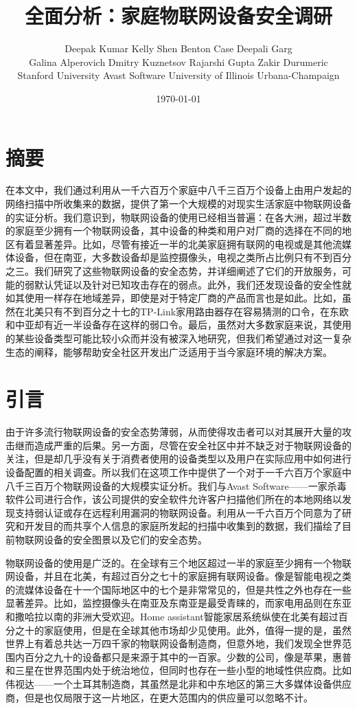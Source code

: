\documentclass[UTF8]{ctexart}
\title{全面分析：家庭物联网设备安全调研}
\author{Deepak Kumar  Kelly Shen  Benton Case  Deepali Garg\\Galina Alperovich  Dmitry Kuznetsov  Rajarshi Gupta  Zakir Durumeric \\Stanford University  Avast Software University of Illinois Urbana-Champaign}
\date{\today}
\begin{document}
	\tableofcontents
	\maketitle
	\section*{摘要}
	在本文中，我们通过利用从一千六百万个家庭中八千三百万个设备上由用户发起的网络扫描中所收集来的数据，提供了第一个大规模的对现实生活家庭中物联网设备的实证分析。我们意识到，物联网设备的使用已经相当普遍：在各大洲，超过半数的家庭至少拥有一个物联网设备，其中设备的种类和用户对厂商的选择在不同的地区有着显著差异。比如，尽管有接近一半的北美家庭拥有联网的电视或是其他流媒体设备，但在南亚，大多数设备却是监控摄像头，电视之类所占比例只有不到百分之三。我们研究了这些物联网设备的安全态势，并详细阐述了它们的开放服务，可能的弱默认凭证以及针对已知攻击存在的弱点。此外，我们还发现设备的安全性就如其使用一样存在地域差异，即使是对于特定厂商的产品而言也是如此。比如，虽然在北美只有不到百分之十七的TP-Link家用路由器存在容易猜测的口令，在东欧和中亚却有近一半设备存在这样的弱口令。最后，虽然对大多数家庭来说，其使用的某些设备类型可能比较小众而并没有被深入地研究，但我们希望通过对这一复杂生态的阐释，能够帮助安全社区开发出广泛适用于当今家庭环境的解决方案。
	
	\section{引言}
	由于许多流行物联网设备的安全态势薄弱，从而使得攻击者可以对其展开大量的攻击继而造成严重的后果。另一方面，尽管在安全社区中并不缺乏对于物联网设备的关注，但是却几乎没有关于消费者使用的设备类型以及用户在实际应用中如何进行设备配置的相关调查。所以我们在这项工作中提供了一个对于一千六百万个家庭中八千三百万个物联网设备的大规模实证分析。我们与Avast Software——一家杀毒软件公司进行合作，该公司提供的安全软件允许客户扫描他们所在的本地网络以发现支持弱认证或存在远程利用漏洞的物联网设备。利用从一千六百万个同意为了研究和开发目的而共享个人信息的家庭所发起的扫描中收集到的数据，我们描绘了目前物联网设备的安全图景以及它们的安全态势。
	
	物联网设备的使用是广泛的。在全球有三个地区超过一半的家庭至少拥有一个物联网设备，并且在北美，有超过百分之七十的家庭拥有联网设备。像是智能电视之类的流媒体设备在十一个国际地区中的七个是非常常见的，但是共性之外也存在一些显著差异。比如，监控摄像头在南亚及东南亚是最受青睐的，而家电用品则在东亚和撒哈拉以南的非洲大受欢迎。Home assistant智能家居系统纵使在北美有超过百分之十的家庭使用，但是在全球其他市场却少见使用。此外，值得一提的是，虽然世界上有着总共达一万四千家的物联网设备制造商，但意外地，我们发现全世界范围内百分之九十的设备都只是来源于其中的一百家。少数的公司，像是苹果，惠普和三星在世界范围内处于统治地位，但同时也存在一些小型的地域性供应商。比如伟视达——一个土耳其制造商，其虽然是北非和中东地区的第三大多媒体设备供应商，但是也仅局限于这一片地区，在更大范围内的供应量可以忽略不计。
	
\end{document}
